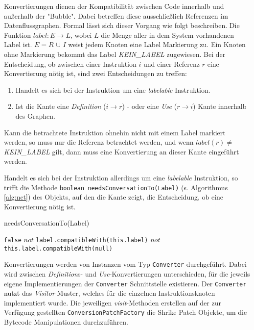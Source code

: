 Konvertierungen dienen der Kompatibilität zwischen Code innerhalb und außerhalb der "Bubble". 
Dabei betreffen diese ausschließlich Referenzen im Datenflussgraphen. Formal lässt sich dieser
Vorgang wie folgt beschreiben. Die Funktion $label:E \rightarrow L$, wobei $L$ die Menge aller in dem
System vorhandenen Label ist. $E = R$ $\cup$ $I$ weist jedem Knoten eine Label Markierung zu. Ein Knoten
ohne Markierung bekommt das Label \textit{KEIN\_LABEL} zugewiesen. Bei der Entscheidung, ob 
zwischen einer Instruktion $i$ und einer Referenz $r$ eine Konvertierung nötig ist, sind zwei 
Entscheidungen zu treffen:

\begin{enumerate}
	\item Handelt es sich bei der Instruktion um eine \textit{labelable} Instruktion.
	\item Ist die Kante eine \textit{Definition} ($i \rightarrow r$) - oder eine \textit{Use} 
	($r \rightarrow i$) Kante innerhalb des Graphen.
\end{enumerate} 

Kann die betrachtete Instruktion ohnehin nicht mit einem Label markiert werden, so
muss nur die Referenz betrachtet werden, und wenn $label(r) \neq$ \textit{KEIN\_LABEL} 
gilt, dann muss eine Konvertierung an dieser Kante eingeführt werden. 

Handelt es sich bei der Instruktion allerdings um eine \textit{labelable} Instruktion, so trifft die Methode
\texttt{boolean needsConversationTo(Label)} (s. Algorithmus \ref{alg:nct}) des Objekts, auf den die 
Kante zeigt, die Entscheidung, ob eine Konvertierung nötig ist.    


\begin{algorithm}[H]
	\caption{needsConversationTo(Label)}\label{alg:nct}
	\begin{algorithmic}[1]
			\RETURN \texttt{false}
		\ENDIF
			\RETURN $not$ \texttt{label.compatibleWith(this.label)}
		\ELSE
			\RETURN $not$ \texttt{this.label.compatibleWith(null)}
		\ENDIF 
	\end{algorithmic}
\end{algorithm}

Konvertierungen werden von Instanzen vom Typ \texttt{Converter} durchgeführt. Dabei wird 
zwischen \textit{Definition}s-
und \textit{Use}-Konvertierungen unterschieden, für die jeweils eigene Implementierungen der \texttt{Converter} 
Schnittstelle existieren. Der \texttt{Converter} nutzt das \textit{Visitor} Muster, welches
für die einzelnen Instruktionsknoten implementiert wurde. Die jeweiligen \textit{visit}-Methoden erstellen  
auf der zur Verfügung gestellten \texttt{ConversionPatchFactory} die Shrike Patch Objekte, um die Bytecode 
Manipulationen durchzuführen. 

